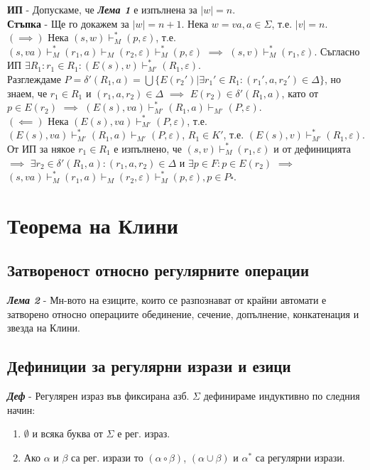 \documentclass[fleqn,12pt]{article}
\begin{document}
\begin{flushleft}
\textbf{ИП} - Допускаме, че \textit{\textbf{Лема 1}} е изпълнена за $|w| = n$. \\

\textbf{Стъпка} - Ще го докажем за $|w| = n + 1$. Нека $w = va, a \in \Sigma$, т.е. $|v| = n$. \\

$(\implies)$ Нека $(s, w) \vdash_M^* (p, \varepsilon)$, т.е. $(s, va) \vdash_M^* (r_1, a) \vdash_M (r_2, \varepsilon) \vdash_M^* (p, \varepsilon)$ $\implies$ $(s, v) \vdash_M^* (r_1, \varepsilon)$. Съгласно ИП $\exists R_1: r_1 \in R_1: (E(s), v) \vdash_{M'}^* (R_1, \varepsilon)$. \\
Разглеждаме $P = \delta'(R_1, a) = \bigcup \{E(r_2') | \exists r_1' \in R_1: (r_1', a, r_2') \in \Delta\}$, но знаем, че $r_1 \in R_1$ и $(r_1, a, r_2) \in \Delta$ $\implies$ $E(r_2) \in \delta'(R_1, a)$, като от $p \in E(r_2)$ $\implies$ $(E(s), va) \vdash_{M'}^* (R_1, a) \vdash_{M'} (P, \varepsilon)$. \\

$(\impliedby)$ Нека $(E(s), va) \vdash_{M'}^* (P, \varepsilon)$, т.е. $(E(s), va) \vdash_{M'}^* (R_1, a) \vdash_{M'} (P, \varepsilon)$, $R_1 \in K'$, т.е. $(E(s), v) \vdash_{M'}^* (R_1, \varepsilon)$.\\
От ИП за някое $r_1 \in R_1$ е изпълнено, че $(s, v) \vdash_M^* (r_1, \varepsilon)$ и от дефиницията $\implies$ $\exists r_2 \in \delta'(R_1, a): (r_1, a, r_2) \in \Delta$ и $\exists p \in F: p \in E(r_2)$ $\implies$ $(s, va) \vdash_M^* (r_1, a) \vdash_M (r_2, \varepsilon) \vdash_M^* (p, \varepsilon), p \in P \square$. 

\section{Теорема на Клини}
\subsection{Затвореност относно регулярните операции}

\textit{\textbf{Лема 2}} - Мн-вото на езиците, които се разпознават от крайни автомати е затворено относно операциите обединение, сечение, допълнение, конкатенация и звезда на Клини.

\subsection{Дефиниции за регулярни изрази и езици}

\textit{\textbf{Деф}} - Регулярен израз във фиксирана азб. $\Sigma$ дефинираме индуктивно по следния начин:
\begin{enumerate}
    \item $\emptyset$ и всяка буква от $\Sigma$ е рег. израз.
    \item Ако $\alpha$ и $\beta$ са рег. изрази то $(\alpha \circ \beta)$, $(\alpha \cup \beta)$ и $\alpha^*$ са регулярни изрази.
\end{enumerate}


\end{flushleft}
\end{document}
